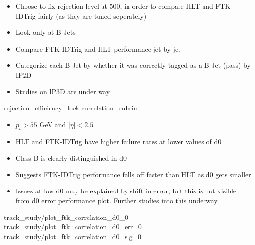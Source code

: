     { \begin{itemize}
        \item Choose to fix rejection level at 500,
            in order to compare HLT and FTK-IDTrig fairly (as they are tuned seperately)
        \item Look only at B-Jets
        \item Compare FTK-IDTrig and HLT performance jet-by-jet
        \item Categorize each B-Jet by whether it was correctly tagged as a B-Jet (pass) by IP2D
        \item Studies on IP3D are under way
    \end{itemize} }
    {rejection_efficiency_lock}
    {correlation_rubric}

    { \begin{itemize}
        \item $p_t > 55$ GeV and $|\eta| < 2.5$
        \item HLT and FTK-IDTrig have higher failure rates at lower values of d0
        \item Class B is clearly distinguished in d0
        \item Suggests FTK-IDTrig performance falls off faster than HLT as d0 gets smaller
        \item Issues at low d0 may be explained by shift in error,
            but this is not visible from d0 error performance plot.
            Further studies into this underway
    \end{itemize} }
    {track_study/plot_ftk_correlation_d0_0}
    {track_study/plot_ftk_correlation_d0_err_0}
    {track_study/plot_ftk_correlation_d0_sig_0}

